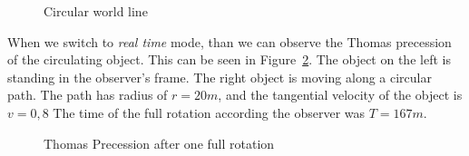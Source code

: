\documentclass{egpubl}
\begin{document}
\begin{figure}[h]
\center
{}
\caption{Circular world line}
\label{fig:circularWL}
\end{figure}

When we switch to \emph{real time} mode, than we can observe the Thomas precession of the circulating object. This can be seen in Figure~\ref{fig:thomasPrec}. The object on the left is standing in the observer's frame. The right object is moving along a circular path. The path has radius of $r=20m$, and the tangential velocity of the object is $v=0,8$
The time of the full rotation according the observer was $T=167m$.
\begin{figure}[h]
\center
{}
\caption{Thomas Precession after one full rotation}
\label{fig:thomasPrec}
\end{figure}
\end{document}
